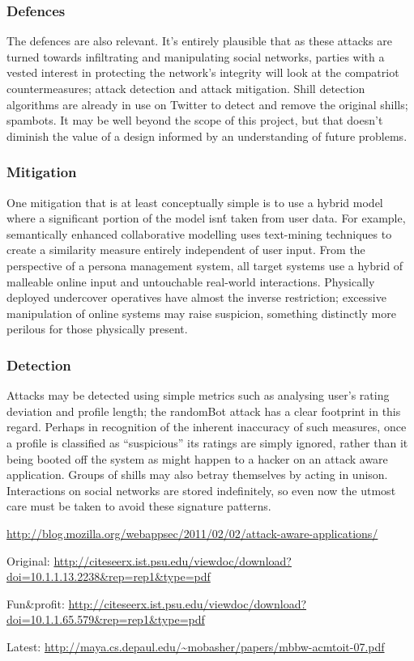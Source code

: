 \subsubsection{Defences}

The defences are also relevant. It's entirely plausible that as these attacks
are turned towards infiltrating and manipulating social networks, parties with a
vested interest in protecting the network's integrity will look at the
compatriot countermeasures; attack detection and attack mitigation. Shill
detection algorithms are already in use on Twitter to detect and remove the
original shills; spambots. It may be well beyond the scope of this project, but
that doesn't diminish the value of a design informed by an understanding of
future problems.

\subsubsection{Mitigation}

One mitigation that is at least conceptually simple  is to use a hybrid model
where a significant portion of the model isn\'t taken from user data. For
example, semantically enhanced collaborative modelling uses text-mining
techniques to create a similarity measure entirely independent of user input.
From the perspective of a persona management system, all target systems use a
hybrid of malleable online input and untouchable real-world interactions.
Physically deployed undercover operatives have almost the inverse restriction;
excessive manipulation of online systems may raise suspicion, something
distinctly more perilous for those physically present.

\subsubsection{Detection}
Attacks may be detected using simple metrics such as analysing user's rating
deviation and profile length; the randomBot attack has a clear footprint in this
regard. Perhaps in recognition of the inherent inaccuracy of such measures, once
a profile is classified as ``suspicious'' its ratings are simply ignored, rather
than it being booted off the system as might happen to a hacker on an attack
aware application. Groups of shills may also betray themselves by acting in unison. Interactions on social networks are stored indefinitely, so even now the utmost care must be taken to avoid these signature patterns.


\url{http://blog.mozilla.org/webappsec/2011/02/02/attack-aware-applications/}

Original: \url{http://citeseerx.ist.psu.edu/viewdoc/download?doi=10.1.1.13.2238\&rep=rep1\&type=pdf}

Fun\&profit: \url{http://citeseerx.ist.psu.edu/viewdoc/download?doi=10.1.1.65.579\&rep=rep1\&type=pdf}

Latest: \url{http://maya.cs.depaul.edu/~mobasher/papers/mbbw-acmtoit-07.pdf}
